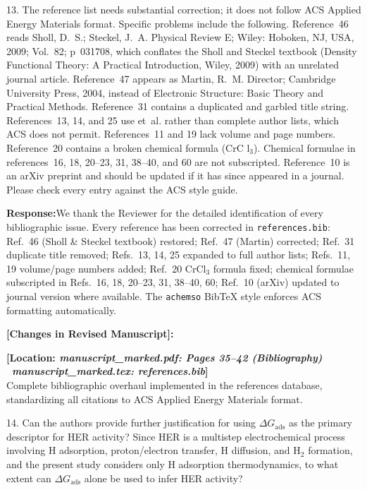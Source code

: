 \documentclass[11pt, sans, a4paper]{moderncv}
\newcommand{\response}{\vspace{0.4em}\noindent\textbf{\color{actionblue}Response:}\hspace{0.5em}}
\newcommand{\manuscriptchange}[1]{{\renewcommand{\label}[1]{}\vspace{0.4em}\noindent\textbf{\color{acsblue}[Changes in Revised Manuscript]:}\par\nopagebreak\vspace{0.15em}#1\vspace{0.4em}}}
\begin{document}
\begin{reviewercomment}
13. The reference list needs substantial correction; it does not follow ACS Applied Energy Materials format. Specific problems include the following. Reference~46 reads Sholl, D.~S.; Steckel, J.~A. Physical Review E; Wiley: Hoboken, NJ, USA, 2009; Vol.~82; p~031708, which conflates the Sholl and Steckel textbook (Density Functional Theory: A Practical Introduction, Wiley, 2009) with an unrelated journal article. Reference~47 appears as Martin, R.~M. Director; Cambridge University Press, 2004, instead of Electronic Structure: Basic Theory and Practical Methods. Reference~31 contains a duplicated and garbled title string. References~13, 14, and 25 use et~al. rather than complete author lists, which ACS does not permit. References~11 and 19 lack volume and page numbers. Reference~20 contains a broken chemical formula ($\text{CrC l}_3$). Chemical formulae in references~16, 18, 20--23, 31, 38--40, and 60 are not subscripted. Reference~10 is an arXiv preprint and should be updated if it has since appeared in a journal. Please check every entry against the ACS style guide.
\end{reviewercomment}

\response We thank the Reviewer for the detailed identification of every bibliographic issue. Every reference has been corrected in \texttt{references.bib}: Ref.~46 (Sholl \& Steckel textbook) restored; Ref.~47 (Martin) corrected; Ref.~31 duplicate title removed; Refs.~13, 14, 25 expanded to full author lists; Refs.~11, 19 volume/page numbers added; Ref.~20 CrCl$_3$ formula fixed; chemical formulae subscripted in Refs.~16, 18, 20--23, 31, 38--40, 60; Ref.~10 (arXiv) updated to journal version where available. The \texttt{achemso} BibTeX style enforces ACS formatting automatically.

\manuscriptchange{\textbf{[Location: \textit{manuscript\_marked.pdf: Pages 35--42 (Bibliography)} \textbar\ \textit{manuscript\_marked.tex: references.bib}]}\\ Complete bibliographic overhaul implemented in the references database, standardizing all citations to ACS Applied Energy Materials format.}

\vspace{0.8em}

\begin{reviewercomment}
14. Can the authors provide further justification for using $\Delta G_{\mathrm{ads}}$ as the primary descriptor for HER activity? Since HER is a multistep electrochemical process involving H adsorption, proton/electron transfer, H diffusion, and $\text{H}_2$ formation, and the present study considers only H adsorption thermodynamics, to what extent can $\Delta G_{\mathrm{ads}}$ alone be used to infer HER activity?
\end{reviewercomment}
\end{document}
